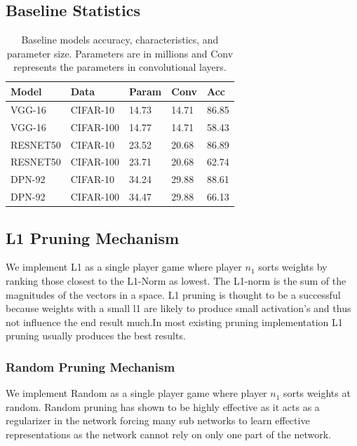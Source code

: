 \documentclass[runningheads]{llncs}
\begin{document}
\subsection{Baseline Statistics}
\begin{tiny}
\begin{table}
\begin{tabular}{|l|l|l|l|l|}
\hline
Model& Data   & Param & Conv& Acc\\ \hline
VGG-16       & CIFAR-10  & 14.73             & 14.71   & 86.85                 \\ \hline
VGG-16       & CIFAR-100 & 14.77           & 14.71     & 58.43                 \\ \hline
RESNET50     & CIFAR-10  & 23.52  & 20.68              & 86.89              \\  \hline
RESNET50     & CIFAR-100 & 23.71 & 20.68               & 62.74               \\\hline
DPN-92       & CIFAR-10  & 34.24         & 29.88       & 88.61                 \\\hline
DPN-92       & CIFAR-100 & 34.47            & 29.88    & 66.13  \\  \hline             
\end{tabular}
\caption{Baseline models accuracy, characteristics, and parameter size. Parameters are in millions and Conv represents the parameters in convolutional layers. }
\label{tab:tab1}
\end{table}
\end{tiny}
\subsection{L1 Pruning Mechanism}
We implement L1 as a single player game where player $n_1$ sorts weights by ranking those closest to the L1-Norm as lowest. The L1-norm is the sum of the magnitudes of the vectors in a space. L1 pruning is thought to be a successful because weights with a small l1 are likely to produce small activation's and thus not influence the end result much.In most existing pruning implementation L1 pruning usually produces the best results. 
\subsubsection{Random Pruning Mechanism}
We implement Random as a single player game where player $n_1$ sorts weights at random. Random pruning has shown to be highly effective as it acts as a regularizer in the network forcing many sub networks to learn effective representations as the network cannot rely on only one part of the network.
\end{document}
